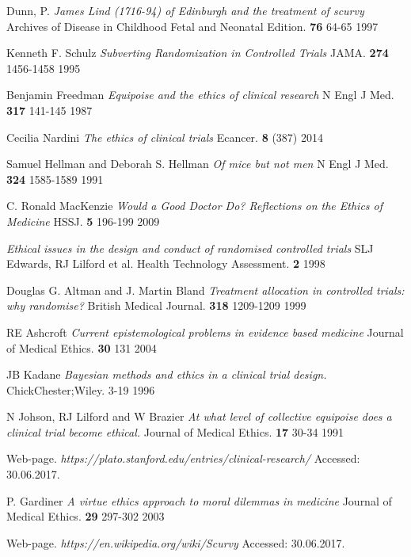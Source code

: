 \documentclass[12p]{article}
\begin{document}
  \begin{thebibliography}{9}
  
  
  Dunn, P.
  \emph{James Lind (1716-94) of Edinburgh and the treatment of scurvy}
  Archives of Disease in Childhood Fetal and Neonatal Edition.
  \textbf{76}
  64-65
  1997
  
  Kenneth F. Schulz
  \emph{Subverting Randomization in Controlled Trials}
  JAMA.
  \textbf{274}
  1456-1458
  1995
  
  Benjamin Freedman
  \emph{Equipoise and the ethics of clinical research}
  N Engl J Med.
  \textbf{317}
  141-145
  1987
  
  Cecilia Nardini
  \emph{The ethics of clinical trials}
  Ecancer.
  \textbf{ 8}
  (387)
  2014
  
    Samuel Hellman and Deborah S. Hellman
    \emph{Of mice but not men}
  N Engl J Med.
  \textbf{324}
  1585-1589
  1991

  C. Ronald MacKenzie  
  \emph{Would a Good Doctor Do? Reflections on the Ethics of Medicine}
  HSSJ.
  \textbf{5}
  196-199
  2009
  
      \emph{Ethical issues in the design and conduct of randomised controlled trials}
  SLJ Edwards, RJ Lilford et al.
  Health Technology Assessment.
  \textbf{2}
  1998

  Douglas G. Altman and J. Martin Bland
  \emph{Treatment allocation in controlled trials: why randomise?}
  British Medical Journal.
  \textbf{318}
  1209-1209
  1999

  RE Ashcroft
  \emph{Current epistemological problems in evidence based medicine}
  Journal of Medical Ethics.
  \textbf{30}
  131
  2004

  JB Kadane
  \emph{Bayesian methods and ethics in a clinical trial design.}
  ChickChester;Wiley.
  3-19
  1996

  N Johson, RJ Lilford and W Brazier
  \emph{At what level of collective equipoise does a clinical trial become ethical.}
  Journal of Medical Ethics.
  \textbf{17}
  30-34
  1991

      Web-page.
      \emph{https://plato.stanford.edu/entries/clinical-research/}
      Accessed: 30.06.2017.

      P. Gardiner
      \emph{A virtue ethics approach to moral dilemmas in medicine}
      Journal of Medical Ethics.
      \textbf{29}
      297-302
      2003
  
      Web-page.
      \emph{https://en.wikipedia.org/wiki/Scurvy}
      Accessed: 30.06.2017.




  \end{thebibliography}
 
\end{document}
